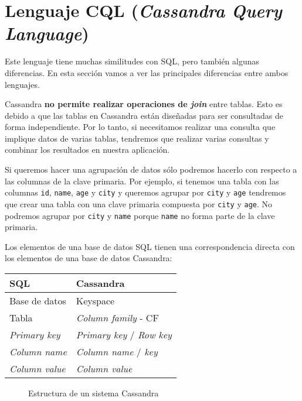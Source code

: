 \documentclass[
]{book}
\begin{document}
\section{\texorpdfstring{Lenguaje CQL (\emph{Cassandra Query Language})}{Lenguaje CQL (Cassandra Query Language)}}\label{lenguaje-cql-cassandra-query-language}

Este lenguaje tiene muchas similitudes con SQL, pero también algunas diferencias. En esta sección vamos a ver las principales diferencias entre ambos lenguajes.

Cassandra \textbf{no permite realizar operaciones de \emph{join}} entre tablas. Esto es debido a que las tablas en Cassandra están diseñadas para ser consultadas de forma independiente. Por lo tanto, si necesitamos realizar una consulta que implique datos de varias tablas, tendremos que realizar varias consultas y combinar los resultados en nuestra aplicación.

Si queremos hacer una agrupación de datos sólo podremos hacerlo con respecto a las columnas de la clave primaria. Por ejemplo, si tenemos una tabla con las columnas \texttt{id}, \texttt{name}, \texttt{age} y \texttt{city} y queremos agrupar por \texttt{city} y \texttt{age} tendremos que crear una tabla con una clave primaria compuesta por \texttt{city} y \texttt{age}. No podremos agrupar por \texttt{city} y \texttt{name} porque \texttt{name} no forma parte de la clave primaria.

Los elementos de una base de datos SQL tienen una correspondencia directa con los elementos de una base de datos Cassandra:

\begin{longtable}[]{@{}ll@{}}
\toprule\noalign{}
SQL & Cassandra \\
\midrule\noalign{}
\endhead
\bottomrule\noalign{}
\endlastfoot
Base de datos & Keyspace \\
Tabla & \emph{Column family} - CF \\
\emph{Primary key} & \emph{Primary key} / \emph{Row key} \\
\emph{Column name} & \emph{Column name} / \emph{key} \\
\emph{Column value} & \emph{Column value} \\
\end{longtable}

\begin{figure}
\centering

\caption{Estructura de un sistema Cassandra}
\end{figure}
\end{document}

